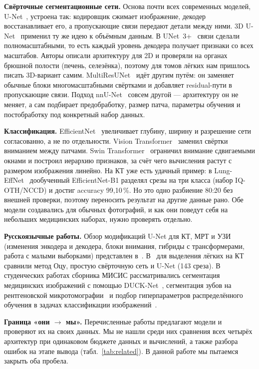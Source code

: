 \documentclass{misisarticle}
\begin{document}
\textbf{Свёрточные сегментационные сети.} Основа почти всех современных моделей, U-Net~\cite{unet}, устроена так: кодировщик сжимает изображение, декодер восстанавливает его, а пропускающие связи передают детали между ними. 3D U-Net~\cite{unet3d} применил ту же идею к объёмным данным. В UNet~3+~\cite{huang} связи сделали полномасштабными, то есть каждый уровень декодера получает признаки со всех масштабов. Авторы описали архитектуру для 2D и проверяли на органах брюшной полости (печень, селезёнка), поэтому для томов лёгких нам пришлось писать 3D-вариант самим. MultiResUNet~\cite{ibtehaz} идёт другим путём: он заменяет обычные блоки многомасштабными свёртками и добавляет residual-пути в пропускающие связи. Подход nnU-Net~\cite{isensee} совсем другой — архитектуру он не меняет, а сам подбирает предобработку, размер патча, параметры обучения и постобработку под конкретный набор данных.

\textbf{Классификация.} EfficientNet~\cite{tan} увеличивает глубину, ширину и разрешение сети согласованно, а не по отдельности. Vision Transformer~\cite{vit} заменил свёртки вниманием между патчами. Swin Transformer~\cite{liu} ограничил внимание сдвигаемыми окнами и построил иерархию признаков, за счёт чего вычисления растут с размером изображения линейно. На КТ уже есть удачный пример: в Lung-EffNet~\cite{raza} дообученный EfficientNet-B1 разделял срезы на три класса (набор IQ-OTH/NCCD) и достиг accuracy 99,10\,\%. Но это одно разбиение 80:20 без внешней проверки, поэтому переносить результат на другие данные рано. Обе модели создавались для обычных фотографий, и как они поведут себя на небольших медицинских наборах, нужно проверять отдельно.

\textbf{Русскоязычные работы.} Обзор модификаций U-Net для КТ, МРТ и УЗИ (изменения энкодера и декодера, блоки внимания, гибриды с трансформерами, работа с малыми выборками) представлен в~\cite{dostovalova}. В~\cite{pashina} для выделения лёгких на КТ сравнили метод Оцу, простую свёрточную сеть и U-Net (143 среза). В студенческих работах сборника МИСИС рассматривались сегментация медицинских изображений с помощью DUCK-Net~\cite{isachenko}, сегментация зубов на рентгеновской микротомографии~\cite{semenov} и подбор гиперпараметров распределённого обучения в задачах классификации изображений~\cite{blinov}.

\textbf{Граница «они $\to$ мы».} Перечисленные работы предлагают модели и проверяют их на своих данных. Мы не нашли среди них сравнения всех четырёх архитектур при одинаковом бюджете данных и вычислений, а также разбора ошибок на этапе вывода (табл.~\ref{tab:related}). В данной работе мы пытаемся закрыть оба пробела.
\end{document}
